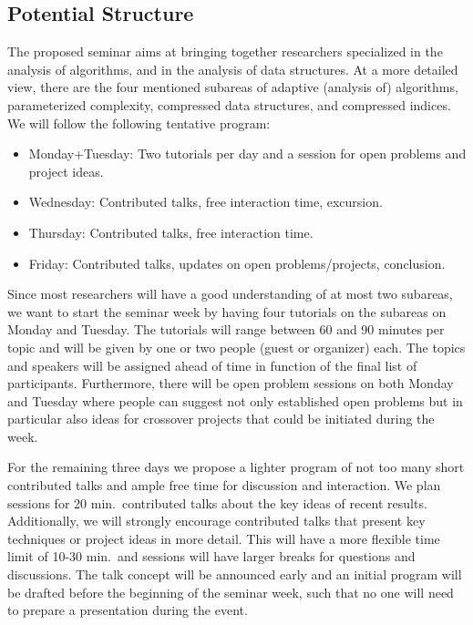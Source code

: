 \documentclass[a4paper,10pt]{article}
\begin{document}
\subsection{Potential Structure}

The proposed seminar aims at bringing together researchers specialized in the analysis of algorithms, and in the analysis of data structures. At a more detailed view, there are the four mentioned subareas of adaptive (analysis of) algorithms, parameterized complexity, compressed data structures, and compressed indices. We will follow the following tentative program:
\begin{itemize}
 \item Monday+Tuesday: Two tutorials per day and a session for open problems and project ideas.
 \item Wednesday: Contributed talks, free interaction time, excursion.
 \item Thursday: Contributed talks, free interaction time.
 \item Friday: Contributed talks, updates on open problems/projects, conclusion.
\end{itemize}

Since most researchers will have a good understanding of at most two subareas, we want to start the seminar week by having four tutorials on the subareas on Monday and Tuesday. The tutorials will range between 60 and 90 minutes per topic and will be given by one or two people (guest or organizer) each. The topics and speakers will be assigned ahead of time in function of the final list of participants. Furthermore, there will be open problem sessions on both Monday and Tuesday where people can suggest not only established open problems but in particular also ideas for crossover projects that could be initiated during the week.

For the remaining three days we propose a lighter program of not too many short contributed talks and ample  free time for discussion and interaction. We plan sessions for 20 min.\ contributed talks about the key ideas of recent results. Additionally, we will strongly encourage contributed talks that present key techniques or project ideas in more detail. This will have a more flexible time limit of 10-30 min.\ and sessions will have larger breaks for questions and discussions. The talk concept will be announced early and an initial program will be drafted before the beginning of the seminar week, such that no one will need to  prepare a presentation during the event.
\end{document}

